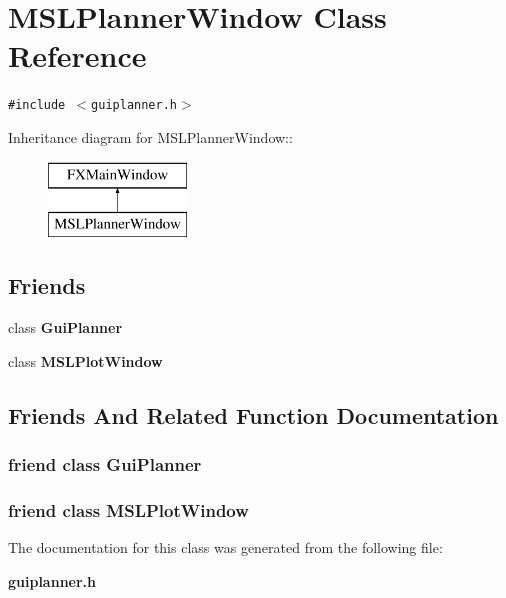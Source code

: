 \section{MSLPlanner\-Window  Class Reference}
\label{class_MSLPlannerWindow}
{\tt \#include $<$guiplanner.h$>$}

Inheritance diagram for MSLPlanner\-Window::\begin{figure}[H]
\begin{center}
\leavevmode
\includegraphics[height=2cm]{class_MSLPlannerWindow}
\end{center}
\end{figure}
\subsection*{Friends}
\begin{CompactItemize}
\item 
class {\bf Gui\-Planner}
\item 
class {\bf MSLPlot\-Window}
\end{CompactItemize}


\subsection{Friends And Related Function Documentation}
\subsubsection{\setlength{\rightskip}{0pt plus 5cm}friend class Gui\-Planner\hspace{0.3cm}{\tt  [friend]}}\label{class_MSLPlannerWindow_l0}


\subsubsection{\setlength{\rightskip}{0pt plus 5cm}friend class MSLPlot\-Window\hspace{0.3cm}{\tt  [friend]}}\label{class_MSLPlannerWindow_l1}




The documentation for this class was generated from the following file:\begin{CompactItemize}
\item 
{\bf guiplanner.h}\end{CompactItemize}
